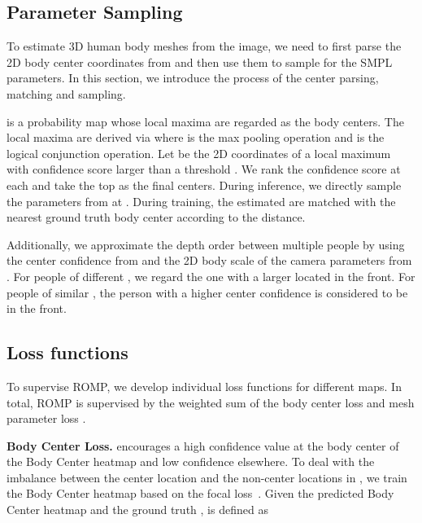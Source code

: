 \documentclass[10pt,twocolumn,letterpaper]{article}
\begin{document}
\vspace{-1mm}
\subsection{Parameter Sampling~\label{sec:parameter sampling}}
\vspace{-1mm}

To estimate 3D human body meshes from the image, we need to first parse the 2D body center coordinates  from  and then use them to sample  for the SMPL parameters. 
In this section, we introduce the process of the center parsing, matching and sampling. 

 is a probability map whose local maxima are regarded as the body centers. 
The local maxima are derived via  where  is the max pooling operation and  is the logical conjunction operation. 
Let  be the 2D coordinates of a local maximum with confidence score larger than a threshold . 
We rank the confidence score at each  and take the top  as the final centers.
During inference, we directly sample the parameters from  at . 
During training, the estimated  are matched with the nearest ground truth body center according to the  distance. 

Additionally, we approximate the depth order between multiple people by using the center confidence from  and the 2D body scale  of the camera parameters from .
For people of different , we regard the one with a larger  located in the front.
For people of similar , the person with a higher center confidence is considered to be in the front.

\vspace{-1mm}
\subsection{Loss functions}
\vspace{-1mm}

To supervise ROMP, we develop individual loss functions for different maps.
In total, ROMP is supervised by the weighted sum of the body center loss  and mesh parameter loss . 

\textbf{Body Center Loss.}  encourages a high confidence value at the body center  of the Body Center heatmap  and low confidence elsewhere.
To deal with the imbalance between the center location and the non-center locations in , we train the Body Center heatmap based on the focal loss~\cite{lin2017focal}. 
Given the predicted Body Center heatmap  and the ground truth ,   is defined as 
\end{document}
